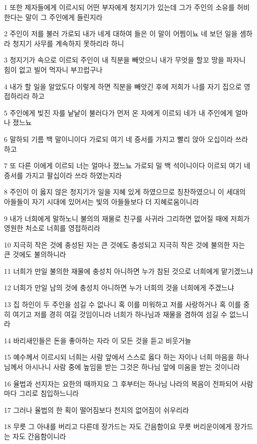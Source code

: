 \par 1 또한 제자들에게 이르시되 어떤 부자에게 청지기가 있는데 그가 주인의 소유를 허비한다는 말이 그 주인에게 들린지라
\par 2 주인이 저를 불러 가로되 내가 네게 대하여 들은 이 말이 어찜이뇨 네 보던 일을 셈하라 청지기 사무를 계속하지 못하리라 하니
\par 3 청지기가 속으로 이르되 주인이 내 직분을 빼앗으니 내가 무엇을 할꼬 땅을 파자니 힘이 없고 빌어 먹자니 부끄럽구나
\par 4 내가 할 일을 알았도다 이렇게 하면 직분을 빼앗긴 후에 저희가 나를 자기 집으로 영접하리라 하고
\par 5 주인에게 빚진 자를 낱낱이 불러다가 먼저 온 자에게 이르되 네가 내 주인에게 얼마나 졌느뇨
\par 6 말하되 기름 백 말이니이다 가로되 여기 네 증서를 가지고 빨리 앉아 오십이라 쓰라 하고
\par 7 또 다른 이에게 이르되 너는 얼마나 졌느뇨 가로되 밀 백 석이니이다 이르되 여기 네 증서를 가지고 팔십이라 쓰라 하였는지라
\par 8 주인이 이 옳지 않은 청지기가 일을 지혜 있게 하였으므로 칭찬하였으니 이 세대의 아들들이 자기 시대에 있어서는 빛의 아들들보다 더 지혜로움이니라
\par 9 내가 너희에게 말하노니 불의의 재물로 친구를 사귀라 그리하면 없어질 때에 저희가 영원한 처소로 너희를 영접하리라
\par 10 지극히 작은 것에 충성된 자는 큰 것에도 충성되고 지극히 작은 것에 불의한 자는 큰 것에도 불의하니라
\par 11 너희가 만일 불의한 재물에 충성치 아니하면 누가 참된 것으로 너희에게 맡기겠느냐
\par 12 너희가 만일 남의 것에 충성치 아니하면 누가 너희의 것을 너희에게 주겠느냐
\par 13 집 하인이 두 주인을 섬길 수 없나니 혹 이를 미워하고 저를 사랑하거나 혹 이를 중히 여기고 저를 경히 여길 것임이니라 너희가 하나님과 재물을 겸하여 섬길 수 없느니라
\par 14 바리새인들은 돈을 좋아하는 자라 이 모든 것을 듣고 비웃거늘
\par 15 예수께서 이르시되 너희는 사람 앞에서 스스로 옳다 하는 자이나 너희 마음을 하나님께서 아시나니 사람 중에 높임을 받는 그것은 하나님 앞에 미움을 받는 것이니라
\par 16 율법과 선지자는 요한의 때까지요 그 후부터는 하나님 나라의 복음이 전파되어 사람마다 그리로 침입하느니라
\par 17 그러나 율법의 한 획이 떨어짐보다 천지의 없어짐이 쉬우리라
\par 18 무릇 그 아내를 버리고 다른데 장가드는 자도 간음함이요 무릇 버리운이에게 장가드는 자도 간음함이니라
